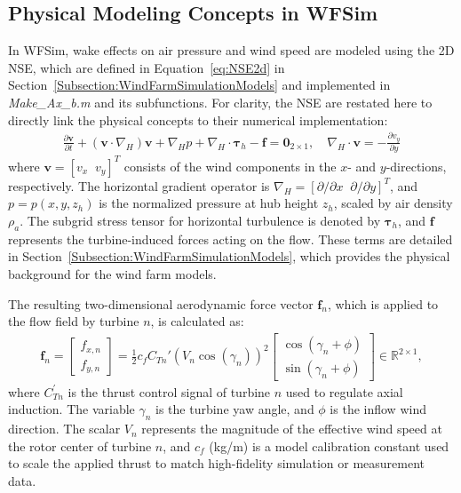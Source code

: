 \subsection{Physical Modeling Concepts in WFSim}
In WFSim, wake effects on air pressure and wind speed are modeled using the 2D NSE, which are defined in Equation~\eqref{eq:NSE2d} in Section~\ref{Subsection:WindFarmSimulationModels} and implemented in \textit{Make\_Ax\_b.m} and its subfunctions. For clarity, the NSE are restated here to directly link the physical concepts to their numerical implementation:  
\begin{align*} 
    \frac{\partial \bm{v}}{\partial t}+ (\bm{v}\cdot \nabla_H)\bm{v} + \nabla_H p + \nabla_H\cdot\bm{\tau}_h  - \bm{f} = \bm{0}_{2\times1},\quad  
    \nabla_H\cdot \bm{v} =  -\frac{\partial v_y}{\partial y}
\end{align*}
where $\bm{v} =[v_x\;\;v_y]^T$ consists of the wind components in the $x$- and $y$-directions, respectively. The horizontal gradient operator is $\nabla_H =[\partial/\partial x \;\; \partial/\partial y]^T$, and $p = p(x,y,z_h)$ is the normalized pressure at hub height $z_h$, scaled by air density $\rho_a$. The subgrid stress tensor for horizontal turbulence is denoted by $\bm{\tau}_h$, and $\bm{f}$ represents the turbine-induced forces acting on the flow. These terms are detailed in Section~\ref{Subsection:WindFarmSimulationModels}, which provides the physical background for the wind farm models.

The resulting two-dimensional aerodynamic force vector $\bm{f}_n$, which is applied to the flow field by turbine $n$, is calculated as:
\begin{align}\label{eq:forceNdim2}
    \bm{f}_n =  
    \begin{bmatrix}
        f_{x,n} \\
        f_{y,n}
    \end{bmatrix} 
    = \frac{1}{2} c_f C_{Tn}' \left(V_n \cos(\gamma_n)\right)^2
    \begin{bmatrix}
        \cos(\gamma_n + \phi) \\
        \sin(\gamma_n + \phi)
    \end{bmatrix} \in \mathbb{R}^{2\times 1},
\end{align}
where $C_{Tn}^{\prime}$ is the thrust control signal of turbine $n$ used to regulate axial induction. The variable $\gamma_n$ is the turbine yaw angle, and $\phi$ is the inflow wind direction. The scalar $V_n$ represents the magnitude of the effective wind speed at the rotor center of turbine $n$, and $c_f$ (kg/m) is a model calibration constant used to scale the applied thrust to match high-fidelity simulation or measurement data.

